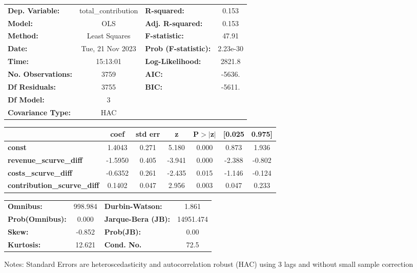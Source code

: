 \begin{center}
\begin{tabular}{lclc}
\toprule
\textbf{Dep. Variable:}             & total\_contribution & \textbf{  R-squared:         } &     0.153   \\
\textbf{Model:}                     &         OLS         & \textbf{  Adj. R-squared:    } &     0.153   \\
\textbf{Method:}                    &    Least Squares    & \textbf{  F-statistic:       } &     47.91   \\
\textbf{Date:}                      &   Tue, 21 Nov 2023  & \textbf{  Prob (F-statistic):} &  2.23e-30   \\
\textbf{Time:}                      &       15:13:01      & \textbf{  Log-Likelihood:    } &    2821.8   \\
\textbf{No. Observations:}          &          3759       & \textbf{  AIC:               } &    -5636.   \\
\textbf{Df Residuals:}              &          3755       & \textbf{  BIC:               } &    -5611.   \\
\textbf{Df Model:}                  &             3       & \textbf{                     } &             \\
\textbf{Covariance Type:}           &         HAC         & \textbf{                     } &             \\
\bottomrule
\end{tabular}
\begin{tabular}{lcccccc}
                                    & \textbf{coef} & \textbf{std err} & \textbf{z} & \textbf{P$> |$z$|$} & \textbf{[0.025} & \textbf{0.975]}  \\
\midrule
\textbf{const}                      &       1.4043  &        0.271     &     5.180  &         0.000        &        0.873    &        1.936     \\
\textbf{revenue\_scurve\_diff}      &      -1.5950  &        0.405     &    -3.941  &         0.000        &       -2.388    &       -0.802     \\
\textbf{costs\_scurve\_diff}        &      -0.6352  &        0.261     &    -2.435  &         0.015        &       -1.146    &       -0.124     \\
\textbf{contribution\_scurve\_diff} &       0.1402  &        0.047     &     2.956  &         0.003        &        0.047    &        0.233     \\
\bottomrule
\end{tabular}
\begin{tabular}{lclc}
\textbf{Omnibus:}       & 998.984 & \textbf{  Durbin-Watson:     } &     1.861  \\
\textbf{Prob(Omnibus):} &   0.000 & \textbf{  Jarque-Bera (JB):  } & 14951.474  \\
\textbf{Skew:}          &  -0.852 & \textbf{  Prob(JB):          } &      0.00  \\
\textbf{Kurtosis:}      &  12.621 & \textbf{  Cond. No.          } &      72.5  \\
\bottomrule
\end{tabular}
\end{center}

Notes: \newline
 [1] Standard Errors are heteroscedasticity and autocorrelation robust (HAC) using 3 lags and without small sample correction